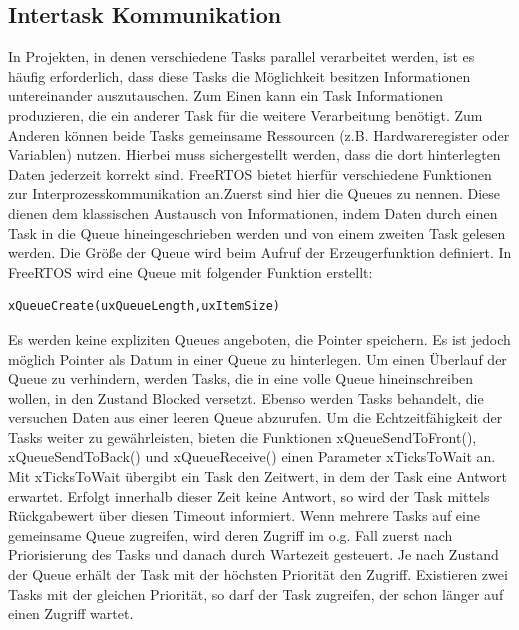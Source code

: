 \subsection{Intertask Kommunikation}
In Projekten, in denen verschiedene Tasks parallel verarbeitet werden, ist es häufig erforderlich, dass diese Tasks die Möglichkeit besitzen Informationen untereinander auszutauschen. Zum Einen kann ein Task Informationen produzieren, die ein anderer Task für die weitere Verarbeitung benötigt. Zum Anderen können beide Tasks gemeinsame Ressourcen (z.B. Hardwareregister oder Variablen) nutzen. Hierbei muss sichergestellt werden, dass die dort hinterlegten Daten jederzeit korrekt sind. FreeRTOS bietet hierfür verschiedene Funktionen zur Interprozesskommunikation an.\newline Zuerst sind hier die Queues zu nennen. Diese dienen dem klassischen Austausch von Informationen, indem Daten durch einen Task in die Queue hineingeschrieben werden und von einem zweiten Task gelesen werden. Die Größe der Queue wird beim Aufruf der Erzeugerfunktion definiert. In FreeRTOS wird eine Queue mit folgender Funktion erstellt: 
\begin{lstlisting}[numbers = none]
xQueueCreate(uxQueueLength,uxItemSize)
\end{lstlisting}
Es werden keine expliziten Queues angeboten, die Pointer speichern. Es ist jedoch möglich Pointer als Datum in einer Queue zu hinterlegen. Um einen Überlauf der Queue zu verhindern, werden Tasks, die in eine volle Queue hineinschreiben wollen, in den Zustand Blocked versetzt. Ebenso werden Tasks behandelt, die versuchen Daten aus einer leeren Queue abzurufen. Um die Echtzeitfähigkeit der Tasks weiter zu gewährleisten, bieten die Funktionen xQueueSendToFront(), xQueueSendToBack() und xQueueReceive() einen Parameter xTicksToWait an. Mit xTicksToWait übergibt ein Task den Zeitwert, in dem der Task eine Antwort erwartet. Erfolgt innerhalb dieser Zeit keine Antwort, so wird der Task mittels Rückgabewert über diesen Timeout informiert.
Wenn mehrere Tasks auf eine gemeinsame Queue zugreifen, wird deren Zugriff im o.g. Fall zuerst nach Priorisierung des Tasks und danach durch Wartezeit gesteuert. Je nach Zustand der Queue erhält der Task mit der höchsten Priorität den Zugriff. Existieren zwei Tasks mit der gleichen Priorität, so darf der Task zugreifen, der schon länger auf einen Zugriff wartet\cite[p.101ff]{MasteringFreeRtos}.\newline
